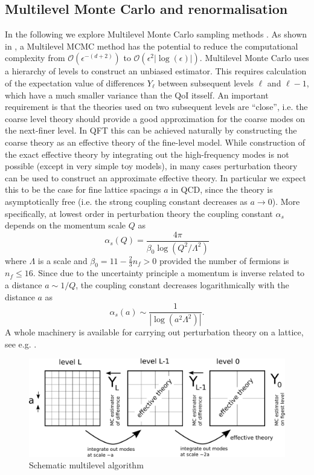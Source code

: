 \documentclass[11pt]{article}
\begin{document}
\subsection{Multilevel Monte Carlo and renormalisation}
In the following we explore Multilevel Monte Carlo sampling methods \cite{Heinrich2001,Giles2008,Giles2015}. As shown in \cite{Dodwell2015}, a Multilevel MCMC method has the potential to reduce the computational complexity from $\mathcal{O}(\epsilon^{-(d+2)})$ to $\mathcal{O}(\epsilon^2 |\log(\epsilon)|)$. Multilevel Monte Carlo uses a hierarchy of levels to construct an unbiased estimator. This requires calculation of the expectation value of differences $Y_\ell$ between subsequent levels $\ell$ and $\ell-1$, which have a much smaller variance than the QoI itsself. An important requirement is that the theories used on two subsequent levels are ``close'', i.e. the coarse level theory should provide a good approximation for the coarse modes on the next-finer level. In QFT this can be achieved naturally by constructing the coarse theory as an effective theory of the fine-level model. While construction of the exact effective theory by integrating out the high-frequency modes is not possible (except in very simple toy models), in many cases perturbation theory can be used to construct an approximate effective theory. In particular we expect this to be the case for fine lattice spacings $a$ in QCD, since the theory is asymptotically free (i.e. the strong coupling constant decreases as $a\rightarrow 0$). More specifically, at lowest order in perturbation theory the coupling constant $\alpha_s$ depends on the momentum scale $Q$ as
\begin{equation}
  \alpha_s(Q) = \frac{4\pi}{\beta_0 \log(Q^2/\Lambda^2)}
\end{equation}
where $\Lambda$ is a scale and $\beta_0=11-\frac{2}{3}n_f>0$ provided the number of fermions is $n_f\le 16$. Since due to the uncertainty principle a momentum is inverse related to a distance $a\sim 1/Q$, the coupling constant decreases logarithmically with the distance $a$ as
\begin{equation}
  \alpha_s(a) \sim \frac{1}{|\log(a^2\Lambda^2)|}.
\end{equation}
A whole machinery is available for carrying out perturbation theory on a lattice, see e.g. \cite{Rothe2005,Hart2009}.
\begin{figure}
\begin{center}
\includegraphics[width=0.9\linewidth]{multilevel_schematic.pdf}
\caption{Schematic multilevel algorithm}
\label{fig:multilevel_schematic}
\end{center}
\end{figure}
\end{document}
